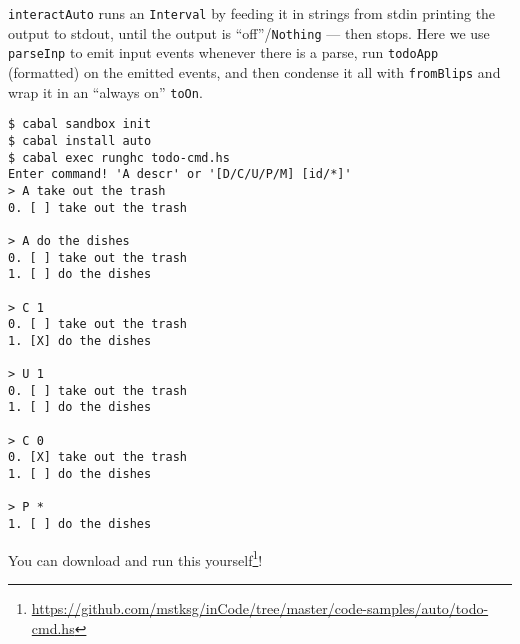 \documentclass[]{article}
\newenvironment{Shaded}{}{}
\newcommand{\CommentTok}[1]{\textcolor[rgb]{0.38,0.63,0.69}{\textit{#1}}}
\newcommand{\DataTypeTok}[1]{\textcolor[rgb]{0.56,0.13,0.00}{#1}}
\newcommand{\FunctionTok}[1]{\textcolor[rgb]{0.02,0.16,0.49}{#1}}
\newcommand{\KeywordTok}[1]{\textcolor[rgb]{0.00,0.44,0.13}{\textbf{#1}}}
\newcommand{\NormalTok}[1]{#1}
\newcommand{\OperatorTok}[1]{\textcolor[rgb]{0.40,0.40,0.40}{#1}}
\newcommand{\OtherTok}[1]{\textcolor[rgb]{0.00,0.44,0.13}{#1}}
\newcommand{\StringTok}[1]{\textcolor[rgb]{0.25,0.44,0.63}{#1}}
\renewcommand{\href}[2]{#2\footnote{\url{#1}}}
\begin{document}
\begin{Shaded}
\end{Shaded}

\texttt{interactAuto} runs an \texttt{Interval} by feeding it in strings from
stdin printing the output to stdout, until the output is
``off''/\texttt{Nothing} --- then stops. Here we use \texttt{parseInp} to emit
input events whenever there is a parse, run \texttt{todoApp} (formatted) on the
emitted events, and then condense it all with \texttt{fromBlips} and wrap it in
an ``always on'' \texttt{toOn}.

\begin{verbatim}
$ cabal sandbox init
$ cabal install auto
$ cabal exec runghc todo-cmd.hs
Enter command! 'A descr' or '[D/C/U/P/M] [id/*]'
> A take out the trash
0. [ ] take out the trash

> A do the dishes
0. [ ] take out the trash
1. [ ] do the dishes

> C 1
0. [ ] take out the trash
1. [X] do the dishes

> U 1
0. [ ] take out the trash
1. [ ] do the dishes

> C 0
0. [X] take out the trash
1. [ ] do the dishes

> P *
1. [ ] do the dishes
\end{verbatim}

You can
\href{https://github.com/mstksg/inCode/tree/master/code-samples/auto/todo-cmd.hs}{download
and run this yourself}!
\end{document}
